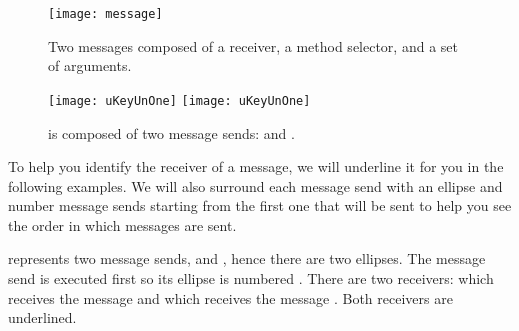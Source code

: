 \documentclass[a4paper,10pt,twoside]{book}
\begin{document}
\begin{figure}[htb]
\begin{minipage}{0.53\textwidth}
	\begin{center}
	\texttt{[image: message]}
	\caption{Two messages composed of a receiver, a method selector, and a set of arguments.\label{fig:firstScriptMessage}}\end{center}
\end{minipage}
\hfill
\begin{minipage}{0.43\textwidth}
	\begin{center}
	\ifluluelse
		{\texttt{[image: uKeyUnOne]}}
		{\texttt{[image: uKeyUnOne]}}
	\caption{ is composed of two message sends:  and .\label{fig:ellipse}}
	\end{center}
\end{minipage}
\end{figure}



To help you identify the receiver of a message, we will underline it for you in the following examples.
We will also surround each message send with an ellipse and number message sends starting from the first one that will be sent to help you see the order in which messages are sent.


 represents two message sends,  and , hence there are two ellipses. The message send  is executed first so its ellipse is numbered .  There are two receivers:  which receives the message  and  which receives the message . Both receivers are underlined.
\end{document}
